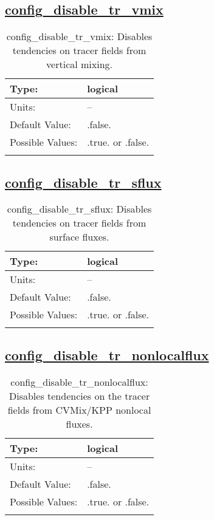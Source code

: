 \subsection[config\_disable\_tr\_vmix]{\hyperref[sec:nm_tab_debug]{config\_disable\_tr\_vmix}}
\label{subsec:nm_sec_config_disable_tr_vmix}
\begin{center}
\begin{longtable}{| p{2.0in} || p{4.0in} |}
    \hline
    Type: & logical \\
    \hline
    Units: & -- \\
    \hline
    Default Value: & .false. \\
    \hline
    Possible Values: & .true. or .false. \\
    \hline
    \caption{config\_disable\_tr\_vmix: Disables tendencies on tracer fields from vertical mixing.}
\end{longtable}
\end{center}
\subsection[config\_disable\_tr\_sflux]{\hyperref[sec:nm_tab_debug]{config\_disable\_tr\_sflux}}
\label{subsec:nm_sec_config_disable_tr_sflux}
\begin{center}
\begin{longtable}{| p{2.0in} || p{4.0in} |}
    \hline
    Type: & logical \\
    \hline
    Units: & -- \\
    \hline
    Default Value: & .false. \\
    \hline
    Possible Values: & .true. or .false. \\
    \hline
    \caption{config\_disable\_tr\_sflux: Disables tendencies on tracer fields from surface fluxes.}
\end{longtable}
\end{center}
\subsection[config\_disable\_tr\_nonlocalflux]{\hyperref[sec:nm_tab_debug]{config\_disable\_tr\_nonlocalflux}}
\label{subsec:nm_sec_config_disable_tr_nonlocalflux}
\begin{center}
\begin{longtable}{| p{2.0in} || p{4.0in} |}
    \hline
    Type: & logical \\
    \hline
    Units: & -- \\
    \hline
    Default Value: & .false. \\
    \hline
    Possible Values: & .true. or .false. \\
    \hline
    \caption{config\_disable\_tr\_nonlocalflux: Disables tendencies on the tracer fields from CVMix/KPP nonlocal fluxes.}
\end{longtable}
\end{center}
